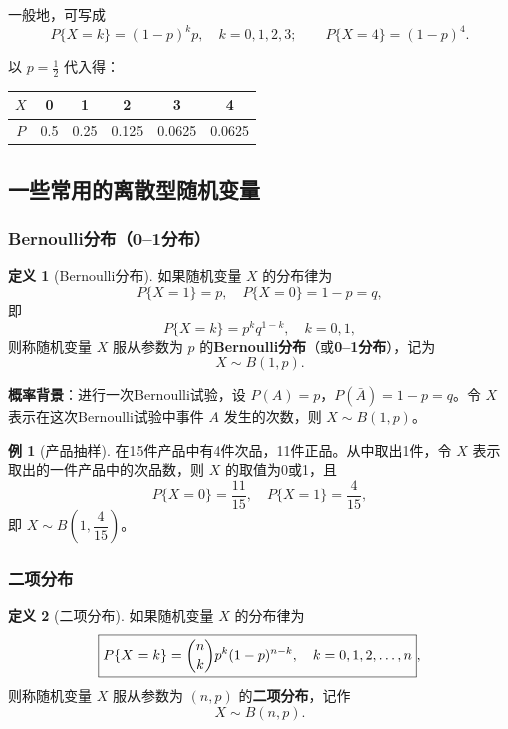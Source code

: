 \documentclass[11pt,a4paper]{report}
\theoremstyle{definition}
\newtheorem{definition}{定义}[chapter]
\newtheorem{example}{例}[chapter]
\begin{document}
一般地，可写成
\[
P\{X=k\} = (1-p)^k p, \quad k=0,1,2,3; \qquad P\{X=4\}=(1-p)^4.
\]

以 $p=\frac{1}{2}$ 代入得：

\begin{table}[htbp]
\centering
\begin{tabular}{@{}cccccc@{}}
\toprule
$X$ & 0 & 1 & 2 & 3 & 4 \\
\midrule
$P$ & 0.5 & 0.25 & 0.125 & 0.0625 & 0.0625 \\
\bottomrule
\end{tabular}
\end{table}

\subsection{一些常用的离散型随机变量}

\subsubsection{Bernoulli分布（0--1分布）}

\begin{definition}[Bernoulli分布]
如果随机变量 $X$ 的分布律为
\[
P\{X=1\}=p, \quad P\{X=0\}=1-p=q,
\]
即
\[
P\{X=k\}=p^k q^{1-k}, \quad k=0,1,
\]
则称随机变量 $X$ 服从参数为 $p$ 的\textbf{Bernoulli分布}（或\textbf{0--1分布}），记为
\[
\boxed{X \sim B(1,p)}.
\]
\end{definition}

\textbf{概率背景}：进行一次Bernoulli试验，设 $P(A)=p$，$P(\bar{A})=1-p=q$。令 $X$ 表示在这次Bernoulli试验中事件 $A$ 发生的次数，则 $X \sim B(1,p)$。

\begin{example}[产品抽样]
在15件产品中有4件次品，11件正品。从中取出1件，令 $X$ 表示取出的一件产品中的次品数，则 $X$ 的取值为0或1，且
\[
P\{X=0\} = \frac{11}{15}, \quad P\{X=1\} = \frac{4}{15},
\]
即 $X \sim B\left(1,\dfrac{4}{15}\right)$。
\end{example}

\subsubsection{二项分布}

\begin{definition}[二项分布]
如果随机变量 $X$ 的分布律为
\[
\boxed{P\{X=k\} = \dbinom{n}{k} p^k (1-p)^{n-k}, \quad k=0,1,2,\dots,n},
\]
则称随机变量 $X$ 服从参数为 $(n,p)$ 的\textbf{二项分布}，记作
\[
\boxed{X \sim B(n,p)}.
\]
\end{definition}
\end{document}
